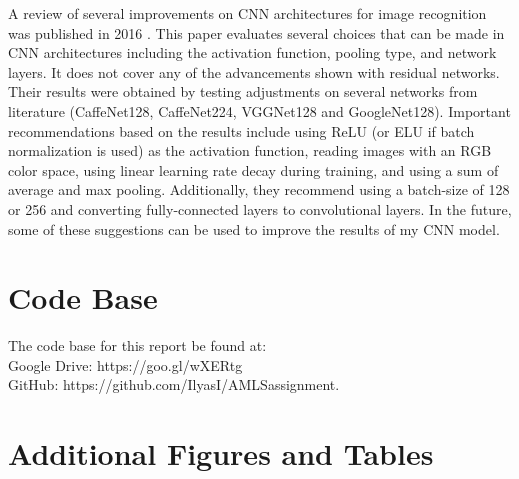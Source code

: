 \documentclass[10pt,twocolumn,letterpaper]{article}
\begin{document}
A review of several improvements on CNN architectures for image recognition was published in 2016 \cite{DBLP:journals/corr/MishkinSM16}. This paper evaluates several choices that can be made in CNN architectures including the activation function, pooling type, and network layers. It does not cover any of the advancements shown with residual networks. Their results were obtained by testing adjustments on several networks from literature (CaffeNet128, CaffeNet224, VGGNet128 and GoogleNet128). Important recommendations based on the results include using ReLU (or ELU if batch normalization is used) as the activation function, reading images with an RGB color space, using linear learning rate decay during training, and using a sum of average and max pooling. Additionally, they recommend using a batch-size of 128 or 256 and converting fully-connected layers to convolutional layers. In the future, some of these suggestions can be used to improve the results of my CNN model.
\newpage
\section{Code Base}

The code base for this report be found at: \\
Google Drive: https://goo.gl/wXERtg\\
GitHub: https://github.com/IlyasI/AMLSassignment.

\section{Additional Figures and Tables}
\label{additional_figures}
\end{document}
